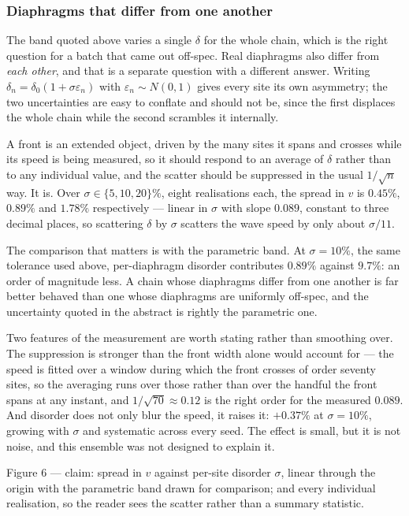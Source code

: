 \subsubsection*{Diaphragms that differ from one another}

The band quoted above varies a single $\delta$ for the whole chain, which is the right
question for a batch that came out off-spec. Real diaphragms also differ from
\emph{each other}, and that is a separate question with a different answer. Writing
$\delta_n = \delta_0(1 + \sigma\varepsilon_n)$ with $\varepsilon_n \sim N(0,1)$ gives
every site its own asymmetry; the two uncertainties are easy to conflate and should
not be, since the first displaces the whole chain while the second scrambles it
internally.

A front is an extended object, driven by the many sites it spans and crosses while its
speed is being measured, so it should respond to an average of $\delta$ rather than to
any individual value, and the scatter should be suppressed in the usual $1/\sqrt{n}$
way. It is. Over $\sigma \in \{5, 10, 20\}\%$, eight realisations each, the spread in
$v$ is $0.45\%$, $0.89\%$ and $1.78\%$ respectively --- linear in $\sigma$ with slope
$0.089$, constant to three decimal places, so scattering $\delta$ by $\sigma$ scatters
the wave speed by only about $\sigma/11$.

The comparison that matters is with the parametric band. At $\sigma = 10\%$, the same
tolerance used above, per-diaphragm disorder contributes $0.89\%$ against $9.7\%$: an
order of magnitude less. A chain whose diaphragms differ from one another is far better
behaved than one whose diaphragms are uniformly off-spec, and the uncertainty quoted in
the abstract is rightly the parametric one.

Two features of the measurement are worth stating rather than smoothing over. The
suppression is stronger than the front width alone would account for --- the speed is
fitted over a window during which the front crosses of order seventy sites, so the
averaging runs over those rather than over the handful the front spans at any instant,
and $1/\sqrt{70} \approx 0.12$ is the right order for the measured $0.089$. And
disorder does not only blur the speed, it raises it: $+0.37\%$ at $\sigma = 10\%$,
growing with $\sigma$ and systematic across every seed. The effect is small, but it is
not noise, and this ensemble was not designed to explain it.

Figure 6 --- claim: spread in $v$ against per-site disorder $\sigma$, linear through the
origin with the parametric band drawn for comparison; and every individual realisation,
so the reader sees the scatter rather than a summary statistic.


